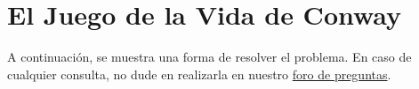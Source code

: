\section{El Juego de la Vida de Conway}
A continuación, se muestra una forma de resolver el problema. En caso de cualquier consulta, no dude en realizarla en nuestro \href{https://aula.usm.cl/mod/forum/view.php?id=2654494}{foro de preguntas}.


